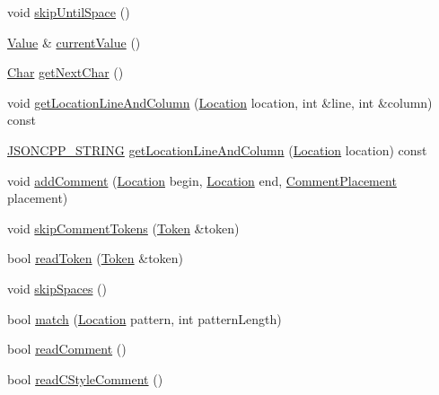 \begin{DoxyCompactItemize}
\item 
void \hyperlink{class_json_1_1_reader_ad922ea5a8ab333084edbb84827861fa3}{skip\+Until\+Space} ()
\item 
\hyperlink{class_json_1_1_value}{Value} \& \hyperlink{class_json_1_1_reader_a85597f763fb0148a17359b6dfc6f7326}{current\+Value} ()
\item 
\hyperlink{class_json_1_1_reader_a3eec9118f3e9a672ba8348c3a79d0f45}{Char} \hyperlink{class_json_1_1_reader_ab61eb61333cc9ec3afe785663a53ce90}{get\+Next\+Char} ()
\item 
void \hyperlink{class_json_1_1_reader_a8b2fb6af24382c3914fd4643b092c675}{get\+Location\+Line\+And\+Column} (\hyperlink{class_json_1_1_reader_a46795b5b272bf79a7730e406cb96375a}{Location} location, int \&line, int \&column) const
\item 
\hyperlink{config_8h_a1e723f95759de062585bc4a8fd3fa4be}{J\+S\+O\+N\+C\+P\+P\+\_\+\+S\+T\+R\+I\+NG} \hyperlink{class_json_1_1_reader_a49757dec5a1a53eff388dc7bf2bda890}{get\+Location\+Line\+And\+Column} (\hyperlink{class_json_1_1_reader_a46795b5b272bf79a7730e406cb96375a}{Location} location) const
\item 
void \hyperlink{class_json_1_1_reader_aaea3bd62d12ffb6117a61476c0685049}{add\+Comment} (\hyperlink{class_json_1_1_reader_a46795b5b272bf79a7730e406cb96375a}{Location} begin, \hyperlink{class_json_1_1_reader_a46795b5b272bf79a7730e406cb96375a}{Location} end, \hyperlink{namespace_json_a4fc417c23905b2ae9e2c47d197a45351}{Comment\+Placement} placement)
\item 
void \hyperlink{class_json_1_1_reader_a22e677ef400d8223f27e631b4cd4b821}{skip\+Comment\+Tokens} (\hyperlink{class_json_1_1_reader_1_1_token}{Token} \&token)
\item 
bool \hyperlink{class_json_1_1_reader_a7cb0631963cc0fd4ff6ed0f570976864}{read\+Token} (\hyperlink{class_json_1_1_reader_1_1_token}{Token} \&token)
\item 
void \hyperlink{class_json_1_1_reader_a40d0f69d15aeb2d52ff78d794f5ab8b2}{skip\+Spaces} ()
\item 
bool \hyperlink{class_json_1_1_reader_a3e5a7bc6b7b53f2ca8cb9da42f8ffb21}{match} (\hyperlink{class_json_1_1_reader_a46795b5b272bf79a7730e406cb96375a}{Location} pattern, int pattern\+Length)
\item 
bool \hyperlink{class_json_1_1_reader_ad2690e860a1b3332c5401fb0850ba065}{read\+Comment} ()
\item 
bool \hyperlink{class_json_1_1_reader_ae0ffe796abdc3c5851589ee500e28c79}{read\+C\+Style\+Comment} ()
\item 

\end{DoxyCompactItemize}
